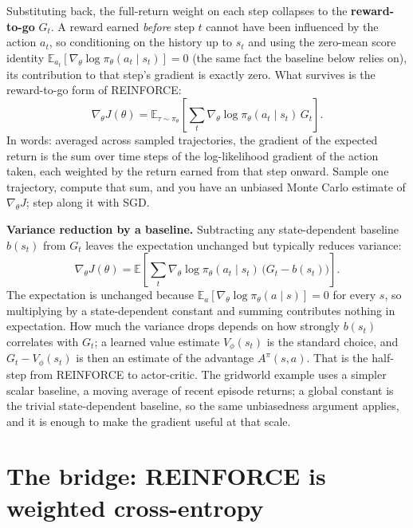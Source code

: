 Substituting back, the full-return weight on each step collapses to the
\textbf{reward-to-go} $G_t$. A reward earned \emph{before} step $t$ cannot have
been influenced by the action $a_t$, so conditioning on the history up to $s_t$
and using the zero-mean score identity $\mathbb{E}_{a_t}[\nabla_\theta \log
\pi_\theta(a_t \mid s_t)] = 0$ (the same fact the baseline below relies on), its
contribution to that step's gradient is exactly zero. What survives is the
reward-to-go form of REINFORCE:
\[
  \boxed{\;\nabla_\theta J(\theta)
    = \mathbb{E}_{\tau \sim \pi_\theta}\!\left[
        \sum_t \nabla_\theta \log \pi_\theta(a_t \mid s_t)\, G_t
      \right].\;}
\]
In words: averaged across sampled trajectories, the gradient of the expected
return is the sum over time steps of the log-likelihood gradient of the action
taken, each weighted by the return earned from that step onward. Sample one
trajectory, compute that sum, and you have an unbiased Monte Carlo estimate of
$\nabla_\theta J$; step along it with SGD.

\textbf{Variance reduction by a baseline.} Subtracting any state-dependent
baseline $b(s_t)$ from $G_t$ leaves the expectation unchanged but typically
reduces variance:
\[
  \nabla_\theta J(\theta)
    = \mathbb{E}\!\left[
        \sum_t \nabla_\theta \log \pi_\theta(a_t \mid s_t)\,
        \bigl(G_t - b(s_t)\bigr)
      \right].
\]
The expectation is unchanged because $\mathbb{E}_a[\nabla_\theta \log
\pi_\theta(a \mid s)] = 0$ for every $s$, so multiplying by a state-dependent
constant and summing contributes nothing in expectation. How much the variance
drops depends on how strongly $b(s_t)$ correlates with $G_t$; a learned value
estimate $V_\phi(s_t)$ is the standard choice, and $G_t - V_\phi(s_t)$ is then
an estimate of the advantage $A^\pi(s, a)$. That is the half-step from
REINFORCE to actor-critic. The gridworld example uses a simpler scalar
baseline, a moving average of recent episode returns; a global constant is the
trivial state-dependent baseline, so the same unbiasedness argument applies, and
it is enough to make the gradient useful at that scale.

\section{The bridge: REINFORCE is weighted cross-entropy}\label{sec:reinforce-bridge}

